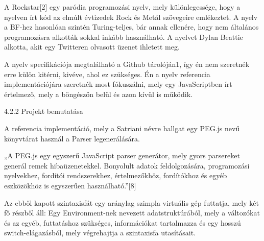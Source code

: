 A Rockstar[2] egy paródia programozási nyelv, mely különlegessége, hogy a nyelven írt kód az elmúlt évtizedek Rock és Metál szövegeire emlékeztet. A nyelv a BF-hez hasonlóan szintén Turing-teljes, bár annak ellenére, hogy nem általános programozásra alkották sokkal inkább használható. A nyelvet Dylan Beattie alkotta, akit egy Twitteren olvasott üzenet ihletett meg.

A nyelv specifikációja megtalálható a Github tárolóján1, így én nem szeretnék erre külön kitérni, kivéve, ahol ez szükséges. Én a nyelv referencia implementációjára szeretnék most fókuszálni, mely egy JavaScriptben írt értelmező, mely a böngészőn belül és azon kívül is működik.

4.2.2 Projekt bemutatása

A referencia implementáció, mely a Satriani névre hallgat egy PEG.js nevű könyvtárat használ a Parser legenerálására.

„A PEG.js egy egyszerű JavaScript parser generátor, mely gyors parsereket generál remek hibaüzenetekkel. Bonyolult adatok feldolgozására, programozási nyelvekhez, fordítói rendszerekhez, értelmezőkhöz, fordítókhoz és egyéb eszközökhöz is egyszerűen használható.”[8]

Az ebből kapott szintaxisfát egy aránylag szimpla virtuális gép futtatja, mely két fő részből áll: Egy Environment-nek nevezett adatstruktúrából, mely a változókat és az egyéb, futtatáshoz szükséges, információkat tartalmazza és egy hosszú switch-elágazásból, mely végrehajtja a szintaxisfa utasításait.